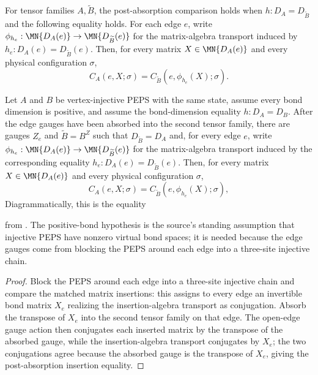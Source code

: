 \begin{definition}%
    \label{def:peps_postAbsorptionEdgeInsertionEquality}
    \leanok
    For tensor families $A,\widetilde B$, the post-absorption comparison holds
    when $h:D_A=D_{\widetilde B}$ and the following equality holds. For each
    edge $e$, write
    $\phi_{h_e}:\MN{D_A(e)}
        \to\MN{D_{\widetilde B}(e)}$ for the matrix-algebra
    transport induced by $h_e:D_A(e)=D_{\widetilde B}(e)$. Then, for every
    matrix $X\in\MN{D_A(e)}$ and every physical configuration
    $\sigma$,
    \[
        C_A(e,X;\sigma)
        =
        C_{\widetilde B}(e,\phi_{h_e}(X);\sigma).
    \]
\end{definition}

\begin{theorem}%
    \label{thm:peps_postAbsorptionEdgeInsertionEquality}
    \leanok
    Let $A$ and $B$ be vertex-injective PEPS with the same state, assume every
    bond dimension is positive, and assume the bond-dimension equality
    $h:D_A=D_B$. After the edge gauges have been
    absorbed into the second tensor family, there are gauges $Z_e$ and
    $\widetilde B=B^Z$ such that $D_{\widetilde B}=D_A$ and, for every edge
    $e$, write $\phi_{h_e}:\MN{D_A(e)}\to\MN{D_{\widetilde B}(e)}$ for the
    matrix-algebra transport induced by the corresponding equality
    $h_e:D_A(e)=D_{\widetilde B}(e)$. Then, for every matrix
    $X\in\MN{D_A(e)}$ and every physical configuration $\sigma$,
    \[
        C_A(e,X;\sigma)
        =
        C_{\widetilde B}(e,\phi_{h_e}(X);\sigma),
    \]
    Diagrammatically, this is the equality
    \begin{center}
        \TNPEPSEdgeInsertionEquality
    \end{center}
    from \cite[Section~3, lines 1037--1065]{Molnar2018NormalPEPS}. The
    positive-bond hypothesis is the source's standing assumption that injective
    PEPS have nonzero virtual bond spaces; it is needed because the edge gauges
    come from blocking the PEPS around each edge into a three-site injective
    chain.
\end{theorem}
\begin{proof}\leanok
    Block the PEPS around each edge into a three-site injective chain and compare
    the matched matrix insertions: this assigns to every edge an invertible bond
    matrix $X_e$ realizing the insertion-algebra transport as conjugation. Absorb
    the transpose of $X_e$ into the second tensor family on that edge. The
    open-edge gauge action then conjugates each inserted matrix by the transpose
    of the absorbed gauge, while the insertion-algebra transport conjugates by
    $X_e$; the two conjugations agree because the absorbed gauge is the transpose
    of $X_e$, giving the post-absorption insertion equality.
\end{proof}


